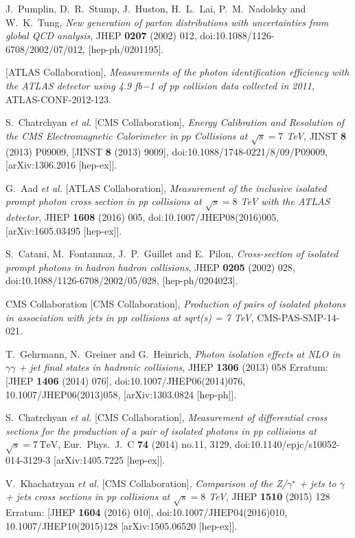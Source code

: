 \documentclass{PoS}
\begin{document}
\begin{thebibliography}{99}
  J.~Pumplin, D.~R.~Stump, J.~Huston, H.~L.~Lai, P.~M.~Nadolsky and W.~K.~Tung,
  {\it New generation of parton distributions with uncertainties from global QCD analysis},
  JHEP {\bf 0207} (2002) 012,
  doi:10.1088/1126-6708/2002/07/012,
  [hep-ph/0201195].

  [ATLAS Collaboration],
  {\it Measurements of the photon identification efficiency with the ATLAS detector using 4.9 fb−1 of pp collision data collected in 2011},
  ATLAS-CONF-2012-123.

  S.~Chatrchyan {\it et al.} [CMS Collaboration],
  {\it Energy Calibration and Resolution of the CMS Electromagnetic Calorimeter in $pp$ Collisions at $\sqrt{s} = 7$ TeV},
  JINST {\bf 8} (2013) P09009,
   [JINST {\bf 8} (2013) 9009],
  doi:10.1088/1748-0221/8/09/P09009,
  [arXiv:1306.2016 [hep-ex]].

  G.~Aad {\it et al.} [ATLAS Collaboration],
  {\it Measurement of the inclusive isolated prompt photon cross section in pp collisions at $ \sqrt{s}=8 $ TeV with the ATLAS detector},
  JHEP {\bf 1608} (2016) 005,
  doi:10.1007/JHEP08(2016)005,
  [arXiv:1605.03495 [hep-ex]].

  S.~Catani, M.~Fontannaz, J.~P.~Guillet and E.~Pilon,
  {\it Cross-section of isolated prompt photons in hadron hadron collisions},
  JHEP {\bf 0205} (2002) 028,
  doi:10.1088/1126-6708/2002/05/028,
  [hep-ph/0204023].

  CMS Collaboration [CMS Collaboration],
  {\it Production of pairs of isolated photons in association with jets in pp collisions at sqrt(s) = 7 TeV},
  CMS-PAS-SMP-14-021.

  T.~Gehrmann, N.~Greiner and G.~Heinrich,
  {\it Photon isolation effects at NLO in $\gamma \gamma$ + jet final states in hadronic collisions},
  JHEP {\bf 1306} (2013) 058
   Erratum: [JHEP {\bf 1406} (2014) 076],
  doi:10.1007/JHEP06(2014)076, 10.1007/JHEP06(2013)058,
  [arXiv:1303.0824 [hep-ph]].

  S.~Chatrchyan {\it et al.} [CMS Collaboration],
  {\it Measurement of differential cross sections for the production of a pair of isolated photons in pp collisions at $\sqrt{s}=7\,\text {TeV} $},
  Eur.\ Phys.\ J.\ C {\bf 74} (2014) no.11,  3129,
  doi:10.1140/epjc/s10052-014-3129-3
  [arXiv:1405.7225 [hep-ex]].

  V.~Khachatryan {\it et al.} [CMS Collaboration],
  {\it Comparison of the Z/$\gamma$$^{∗}$ + jets to $\gamma$ + jets cross sections in pp collisions at $ \sqrt{s}=8 $ TeV},
  JHEP {\bf 1510} (2015) 128
   Erratum: [JHEP {\bf 1604} (2016) 010],
  doi:10.1007/JHEP04(2016)010, 10.1007/JHEP10(2015)128
  [arXiv:1505.06520 [hep-ex]].


\end{thebibliography}
\end{document}
